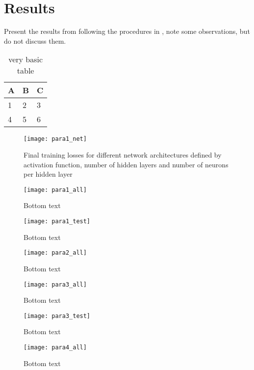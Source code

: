 \chapter{Results}\label{CH5}
Present the results from following the procedures in , note some observations, but do not discuss them.

\begin{table}[h]
    \centering
    \begin{tabular}{l | l | l}
    A & B & C \\
    \hline
    1 & 2 & 3 \\
    4 & 5 & 6
    \end{tabular}
    \caption{very basic table}
    \label{tab:abc}
    \end{table}

\begin{figure}
    \centering
    \texttt{[image: para1\_net]}
    \caption{Final training losses for different network architectures defined by activation function, number of hidden layers and number of neurons per hidden layer}
    \label{fig:para1_net}
\end{figure}

\begin{figure}
    \centering
    \texttt{[image: para1\_all]}
    \caption{Bottom text}
    \label{fig:para1_all}
\end{figure}

\begin{figure}
    \centering
    \texttt{[image: para1\_test]}
    \caption{Bottom text}
    \label{fig:para1_test}
\end{figure}

\begin{figure}
    \centering
    \texttt{[image: para2\_all]}
    \caption{Bottom text}
    \label{fig:para2_all}
\end{figure}

\begin{figure}
    \centering
    \texttt{[image: para3\_all]}
    \caption{Bottom text}
    \label{fig:para3_all}
\end{figure}

\begin{figure}
    \centering
    \texttt{[image: para3\_test]}
    \caption{Bottom text}
    \label{fig:para3_test}
\end{figure}

\begin{figure}
    \centering
    \texttt{[image: para4\_all]}
    \caption{Bottom text}
    \label{fig:para4_all}
\end{figure}

